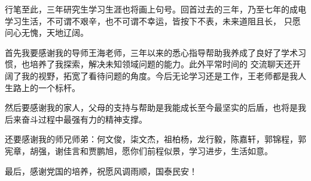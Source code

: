 \thesisacknowledgement

行笔至此，三年研究生学习生涯也将画上句号。回首过去的三年，乃至七年的成电学习生活，不可谓不艰辛，也不可谓不幸运，皆按下不表，未来道阻且长，
只愿问心无愧，天地辽阔。

首先我要感谢我的导师王海老师，三年以来的悉心指导帮助我养成了良好了学术习惯，也培养了我探索，解决未知领域问题的能力。此外平常时间的
交流聊天还开阔了我的视野，拓宽了看待问题的角度。今后无论学习还是工作，王老师都是我人生路上的一个标杆。

然后要感谢我的家人，父母的支持与帮助是我能成长至今最坚实的后盾，也将是我后来奋斗过程中最强有力的精神支撑。

还要感谢我的师兄师弟：何文俊，柒文杰，祖柏杨，龙行毅，陈嘉轩，郭锦程，郭宪章，胡强，谢佳言和贾鹏旭，愿你们前程似景，学习进步，生活如意。

最后，感谢党国的培养，祝愿风调雨顺，国泰民安！

